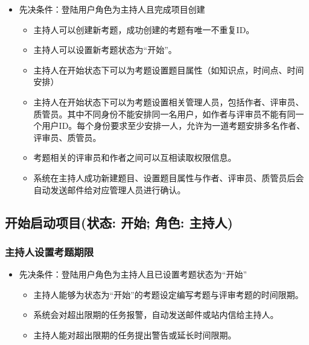\documentclass[hyperref, a4paper]{ctexart}
\providecommand{\tightlist}{%
  \setlength{\itemsep}{0pt}\setlength{\parskip}{0pt}}
\begin{document}
\begin{itemize}
\tightlist
\item
  先决条件：登陆用户角色为主持人且完成项目创建

  \begin{itemize}
  \tightlist
  \item
    主持人可以创建新考题，成功创建的考题有唯一不重复ID。
  \item
    主持人可以设置新考题状态为``开始''。
  \item
    主持人在开始状态下可以为考题设置题目属性（如知识点，时间点、时间安排）
  \item
    主持人在开始状态下可以为考题设置相关管理人员，包括作者、评审员、质管员。其中不同身份不能安排同一名用户，如作者与评审员不能有同一个用户ID。每个身份要求至少安排一人，允许为一道考题安排多名作者、评审员、质管员。
  \item
    考题相关的评审员和作者之间可以互相读取权限信息。
  \item
    系统在主持人成功新建题目、设置题目属性与作者、评审员、质管员后会自动发送邮件给对应管理人员进行确认。
  \end{itemize}
\end{itemize}

\hypertarget{ux5f00ux59cbux542fux52a8ux9879ux76eeux72b6ux6001-ux5f00ux59cb-ux89d2ux8272-ux4e3bux6301ux4eba}{%
\subsection{开始启动项目(状态: 开始; 角色:
主持人)}\label{ux5f00ux59cbux542fux52a8ux9879ux76eeux72b6ux6001-ux5f00ux59cb-ux89d2ux8272-ux4e3bux6301ux4eba}}

\hypertarget{ux4e3bux6301ux4ebaux8bbeux7f6eux8003ux9898ux671fux9650}{%
\subsubsection{主持人设置考题期限}\label{ux4e3bux6301ux4ebaux8bbeux7f6eux8003ux9898ux671fux9650}}

\begin{itemize}
\tightlist
\item
  先决条件：登陆用户角色为主持人且已设置考题状态为``开始''

  \begin{itemize}
  \tightlist
  \item
    主持人能够为状态为``开始''的考题设定编写考题与评审考题的时间限期。
  \item
    系统会对超出限期的任务报警，自动发送邮件或站内信给主持人。
  \item
    主持人能对超出限期的任务提出警告或延长时间限期。
  \end{itemize}
\end{itemize}
\end{document}
